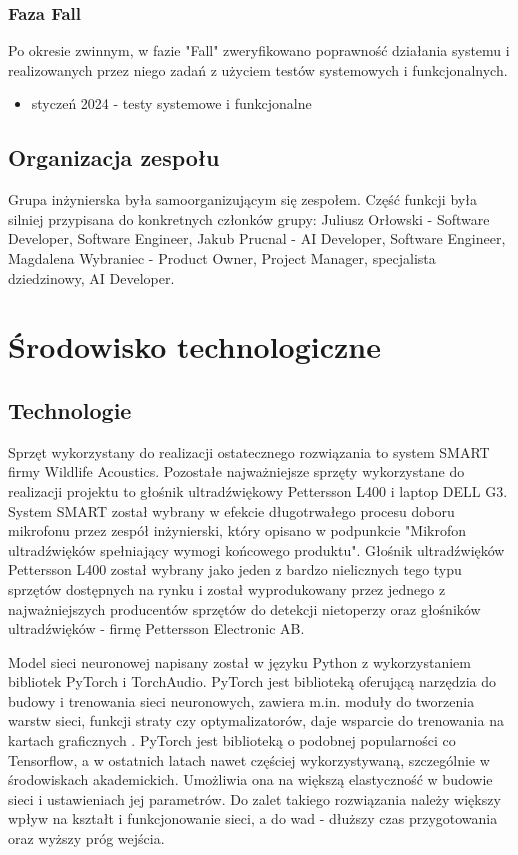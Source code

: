 \documentclass{sprz}
\begin{document}
\subsubsection{Faza Fall}
Po okresie zwinnym, w fazie "Fall" zweryfikowano poprawność działania systemu i realizowanych przez niego zadań z użyciem testów systemowych i funkcjonalnych.
\begin{itemize}
  \item{styczeń 2024 - testy systemowe i funkcjonalne}
  \end{itemize}

\subsection{Organizacja zespołu}
Grupa inżynierska była samoorganizującym się zespołem. Część funkcji była silniej przypisana do konkretnych członków grupy:
Juliusz Orłowski - Software Developer, Software Engineer, Jakub Prucnal - AI Developer, Software Engineer, Magdalena Wybraniec - Product Owner, Project Manager, specjalista dziedzinowy, AI Developer. 

\section{Środowisko technologiczne}

\subsection{Technologie}
Sprzęt wykorzystany do realizacji ostatecznego rozwiązania to system SMART firmy Wildlife Acoustics. Pozostałe najważniejsze sprzęty wykorzystane do realizacji projektu to głośnik ultradźwiękowy Pettersson L400 i laptop DELL G3. System SMART został wybrany w efekcie długotrwałego procesu doboru mikrofonu przez zespół inżynierski, który opisano w podpunkcie "Mikrofon ultradźwięków spełniający wymogi końcowego produktu". Głośnik ultradźwięków Pettersson L400 został wybrany jako jeden z bardzo nielicznych tego typu sprzętów dostępnych na rynku i został wyprodukowany przez jednego z najważniejszych producentów sprzętów do detekcji nietoperzy oraz głośników ultradźwięków - firmę Pettersson Electronic AB.

Model sieci neuronowej napisany został w języku Python z wykorzystaniem bibliotek PyTorch i TorchAudio.
PyTorch jest biblioteką oferującą narzędzia do budowy i trenowania sieci neuronowych, zawiera m.in. moduły do tworzenia warstw sieci, funkcji straty czy optymalizatorów, daje wsparcie do trenowania na kartach graficznych \cite{pytorch}.
PyTorch jest biblioteką o podobnej popularności co Tensorflow, a w ostatnich latach nawet częściej wykorzystywaną, szczególnie w środowiskach akademickich. Umożliwia ona na większą elastyczność w budowie sieci i ustawieniach jej parametrów. Do zalet takiego rozwiązania należy większy wpływ na kształt i funkcjonowanie sieci, a do wad - dłuższy czas przygotowania oraz wyższy próg wejścia. 
\end{document}

